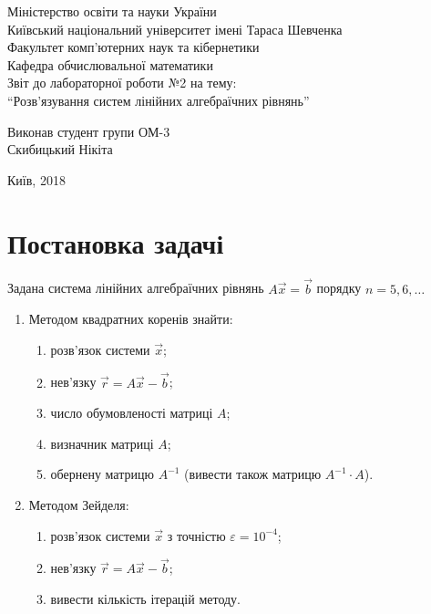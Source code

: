 \documentclass[12pt, a4paper]{article}
\theoremstyle{definition}
\renewcommand{\epsilon}{\varepsilon}
\numberwithin{equation}{section}
\begin{document}
\setlength\parindent{0pt}
\allowdisplaybreaks

\begin{center}
\hfill \break
Міністерство освіти та науки України \\
Київський національний університет імені Тараса Шевченка \\ 
Факультет комп'ютерних наук та кібернетики \\
Кафедра обчислювальної математики \\
\vfill 
\large{Звіт до лабораторної роботи №2 на тему: \\ ``Розв'язування систем лінійних алгебраїчних рівнянь''} \\
\vfill 
\end{center}
\begin{flushright}
Виконав студент групи ОМ-3 \\
Скибицький Нікіта
\end{flushright}
\vfill 
\begin{center}
    Київ, 2018 
\end{center}
\thispagestyle{empty}
 
\newpage

\section{Постановка задачі}

Задана система лінійних алгебраїчних рівнянь $A \vec x = \vec b$ порядку $n = 5, 6, \ldots$

\begin{enumerate}
	\item Методом квадратних коренів знайти:
	\begin{enumerate}
		\item розв'язок системи $\vec x$;
		\item нев'язку $\vec r = A \vec x - \vec b$;
		\item число обумовленості матриці $A$;
		\item визначник матриці $A$;
		\item обернену матрицю $A^{-1}$ (вивести також матрицю $A^{-1} \cdot A$).
	\end{enumerate}
	\item Методом Зейделя:
	\begin{enumerate}
		\item розв'язок системи $\vec x$ з точністю $\epsilon = 10^{-4}$;
		\item нев'язку $\vec r = A \vec x - \vec b$;
		\item вивести кількість ітерацій методу.
	\end{enumerate}
\end{enumerate}
\end{document}
